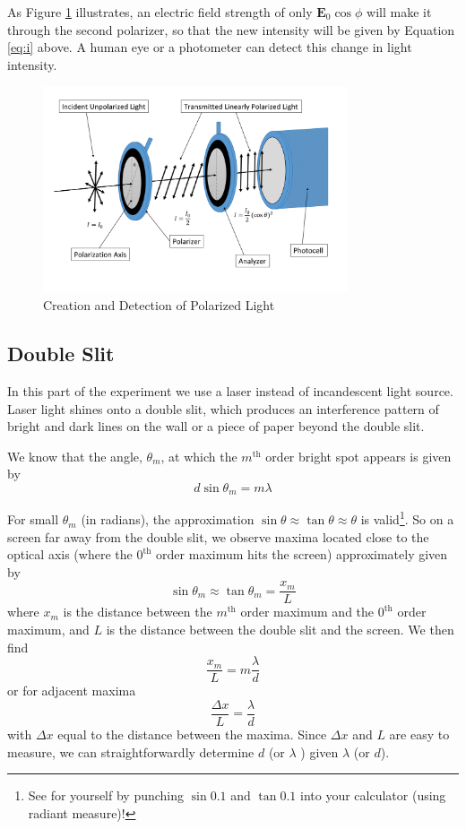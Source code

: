 As Figure {\ref{fig:polarized}} illustrates, an electric field strength of only $\mathbf{E}_{0}\cos\phi$ will make it through the second polarizer, so that the new intensity will be given by Equation {\ref{eq:i}} above. A human eye or a photometer can detect this change in light intensity.
\begin{figure}[h]
\centering
\includegraphics[width=0.8\textwidth]{./Exp8/pic/image7.png}
\caption{Creation and Detection of Polarized Light}
\label{fig:polarized}
\end{figure}

\subsection{Double Slit}
In this part of the experiment we use a laser instead of incandescent light source. Laser light shines onto a double slit, which produces an interference pattern of bright and dark lines on the wall or a piece of paper beyond the double slit. \myskip

We know that the angle, $\theta_{m}$, at which the $m^{\mathrm{th}}$ order bright spot appears is given by
\begin{equation}
 d\sin\theta_{m}=m\lambda
\end{equation}

For small $\theta_{m}$ (in radians), the approximation $\sin\theta \approx \tan\theta \approx \theta$ is valid\footnote{See for yourself by punching $\sin 0.1$ and $\tan 0.1$ into your calculator (using radiant measure)!}. So on a screen far away from the double slit, we observe maxima located close to the optical axis (where the $0^{\mathrm{th}}$ order maximum hits the screen) approximately given by
\begin{equation}
\sin\theta_{m}\approx\tan\theta_{m}=\frac{x_{m}}{L}
\end{equation}
where $x_m$ is the distance between the $m^{\mathrm{th}}$ order maximum and the $0^{\mathrm{th}}$ order maximum, and $L$ is the distance between the double slit and the screen. We then find
\begin{equation}
\frac{x_{m}}{L}=m\frac{\lambda}{d}
\end{equation}
or for adjacent maxima
\begin{equation}
 \frac{\Delta x}{L}=\frac{\lambda}{d}
\end{equation}
with $\Delta x$ equal to the distance between the maxima. Since $\Delta x$ and $L$ are easy to measure, we can straightforwardly determine $d$ (or $\lambda$ ) given $\lambda$ (or $d$).


